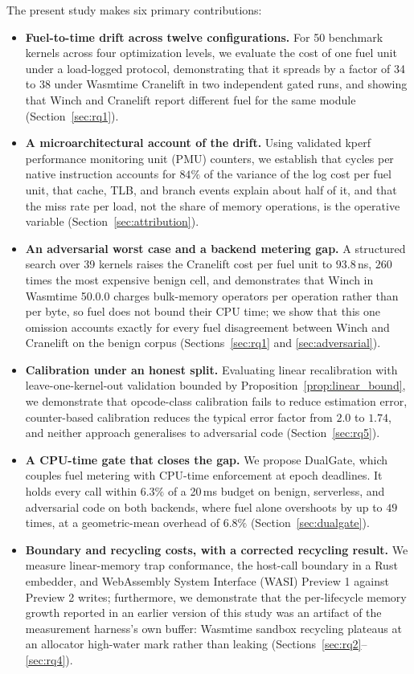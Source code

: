 \documentclass{ws-jcsc}
\begin{document}
The present study makes six primary contributions:
\begin{itemize}
\item \textbf{Fuel-to-time drift across twelve configurations.} For 50 benchmark kernels across four optimization levels, we evaluate the cost of one fuel unit under a load-logged protocol, demonstrating that it spreads by a factor of 34 to 38 under Wasmtime Cranelift in two independent gated runs, and showing that Winch and Cranelift report different fuel for the same module (Section~\ref{sec:rq1}).
\item \textbf{A microarchitectural account of the drift.} Using validated kperf performance monitoring unit (PMU) counters, we establish that cycles per native instruction accounts for $84\%$ of the variance of the log cost per fuel unit, that cache, TLB, and branch events explain about half of it, and that the miss rate per load, not the share of memory operations, is the operative variable (Section~\ref{sec:attribution}).
\item \textbf{An adversarial worst case and a backend metering gap.} A structured search over 39 kernels raises the Cranelift cost per fuel unit to $93.8$\,ns, $260$ times the most expensive benign cell, and demonstrates that Winch in Wasmtime 50.0.0 charges bulk-memory operators per operation rather than per byte, so fuel does not bound their CPU time; we show that this one omission accounts exactly for every fuel disagreement between Winch and Cranelift on the benign corpus (Sections~\ref{sec:rq1} and \ref{sec:adversarial}).
\item \textbf{Calibration under an honest split.} Evaluating linear recalibration with leave-one-kernel-out validation bounded by Proposition~\ref{prop:linear_bound}, we demonstrate that opcode-class calibration fails to reduce estimation error, counter-based calibration reduces the typical error factor from $2.0$ to $1.74$, and neither approach generalises to adversarial code (Section~\ref{sec:rq5}).
\item \textbf{A CPU-time gate that closes the gap.} We propose DualGate, which couples fuel metering with CPU-time enforcement at epoch deadlines. It holds every call within $6.3\%$ of a 20\,ms budget on benign, serverless, and adversarial code on both backends, where fuel alone overshoots by up to $49$ times, at a geometric-mean overhead of $6.8\%$ (Section~\ref{sec:dualgate}).
\item \textbf{Boundary and recycling costs, with a corrected recycling result.} We measure linear-memory trap conformance, the host-call boundary in a Rust embedder, and WebAssembly System Interface (WASI) Preview 1 against Preview 2 writes; furthermore, we demonstrate that the per-lifecycle memory growth reported in an earlier version of this study was an artifact of the measurement harness's own buffer: Wasmtime sandbox recycling plateaus at an allocator high-water mark rather than leaking (Sections~\ref{sec:rq2}--\ref{sec:rq4}).
\end{itemize}
\end{document}
